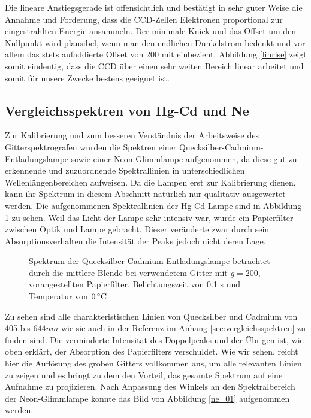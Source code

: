		Die lineare Anstiegsgerade ist offensichtlich und bestätigt in sehr guter Weise die Annahme und Forderung, dass die CCD-Zellen Elektronen proportional zur eingestrahlten Energie ansammeln.
		Der minimale Knick und das Offset um den Nullpunkt wird plausibel, wenn man den endlichen Dunkelstrom bedenkt und vor allem das stets aufaddierte Offset von 200 mit einbezieht.
		Abbildung \ref{linrise} zeigt somit eindeutig, dass die CCD über einen sehr weiten Bereich linear arbeitet und somit für unsere Zwecke bestens geeignet ist.



	\subsection{Vergleichsspektren von Hg-Cd und Ne} %
	\label{sub:vergleichsspektren_von_hg_cd_und_ne}

		Zur Kalibrierung und zum besseren Verständnis der Arbeitsweise des Gitterspektrografen wurden die Spektren einer Quecksilber-Cadmium-Entladungslampe sowie einer Neon-Glimmlampe aufgenommen, da diese gut zu erkennende und zuzuordnende Spektrallinien in unterschiedlichen Wellenlängenbereichen aufweisen.
		Da die Lampen erst zur Kalibrierung dienen, kann ihr Spektrum in diesem Abschnitt natürlich nur qualitativ ausgewertet werden.
		Die aufgenommenen Spektrallinien der Hg-Cd-Lampe sind in Abbildung \ref{hg_01} zu sehen. Weil das Licht der Lampe sehr intensiv war, wurde ein Papierfilter zwischen Optik und Lampe gebracht. 
		Dieser veränderte zwar durch sein Absorptionsverhalten die Intensität der Peaks jedoch nicht deren Lage.

		\begin{figure}
			\center
			
			\caption{Spektrum der Quecksilber-Cadmium-Entladungslampe betrachtet durch die mittlere Blende bei verwendetem Gitter mit $g=200$, vorangestellten Papierfilter, Belichtungszeit von 0.1 s und Temperatur von $0\, \text{$^\circ$C}$}
			\label{hg_01}
		\end{figure}

		Zu sehen sind alle charakteristischen Linien von Quecksilber und Cadmium von 405 bis $644\unit{nm}$ wie sie auch in der Referenz im Anhang \ref{sec:vergleichsspektren} zu finden sind.
		Die verminderte Intensität des Doppelpeaks und der Übrigen ist, wie oben erklärt, der Absorption des Papierfilters verschuldet.
		Wie wir sehen, reicht hier die Auflösung des groben Gitters vollkommen aus, um alle relevanten Linien zu zeigen und es bringt zu dem den Vorteil, das gesamte Spektrum auf eine Aufnahme zu projizieren.
		Nach Anpassung des Winkels an den Spektralbereich der Neon-Glimmlampe konnte das Bild von Abbildung \ref{ne_01} aufgenommen werden.

